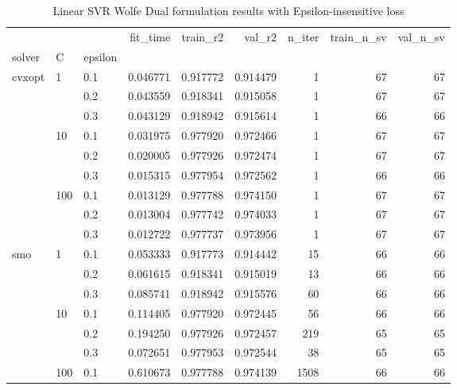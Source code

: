 \begin{table}[h!]
\centering
\caption{Linear SVR Wolfe Dual formulation results with Epsilon-insensitive loss}
\label{linear_dual_svr_cv_results}
\begin{tabular}{lllrrrrrr}
\toprule
       &     &     &  fit\_time &  train\_r2 &    val\_r2 &  n\_iter &  train\_n\_sv &  val\_n\_sv \\
solver & C & epsilon &           &           &           &         &             &           \\
\midrule
cvxopt & 1   & 0.1 &  0.046771 &  0.917772 &  0.914479 &       1 &          67 &        67 \\
       &     & 0.2 &  0.043559 &  0.918341 &  0.915058 &       1 &          67 &        67 \\
       &     & 0.3 &  0.043129 &  0.918942 &  0.915614 &       1 &          66 &        66 \\
       & 10  & 0.1 &  0.031975 &  0.977920 &  0.972466 &       1 &          67 &        67 \\
       &     & 0.2 &  0.020005 &  0.977926 &  0.972474 &       1 &          67 &        67 \\
       &     & 0.3 &  0.015315 &  0.977954 &  0.972562 &       1 &          66 &        66 \\
       & 100 & 0.1 &  0.013129 &  0.977788 &  0.974150 &       1 &          67 &        67 \\
       &     & 0.2 &  0.013004 &  0.977742 &  0.974033 &       1 &          67 &        67 \\
       &     & 0.3 &  0.012722 &  0.977737 &  0.973956 &       1 &          67 &        67 \\
smo & 1   & 0.1 &  0.053333 &  0.917773 &  0.914442 &      15 &          66 &        66 \\
       &     & 0.2 &  0.061615 &  0.918341 &  0.915019 &      13 &          66 &        66 \\
       &     & 0.3 &  0.085741 &  0.918942 &  0.915576 &      60 &          66 &        66 \\
       & 10  & 0.1 &  0.114405 &  0.977920 &  0.972445 &      56 &          66 &        66 \\
       &     & 0.2 &  0.194250 &  0.977926 &  0.972457 &     219 &          65 &        65 \\
       &     & 0.3 &  0.072651 &  0.977953 &  0.972544 &      38 &          65 &        65 \\
       & 100 & 0.1 &  0.610673 &  0.977788 &  0.974139 &    1508 &          66 &        66 \\

\end{tabular}
\end{table}
